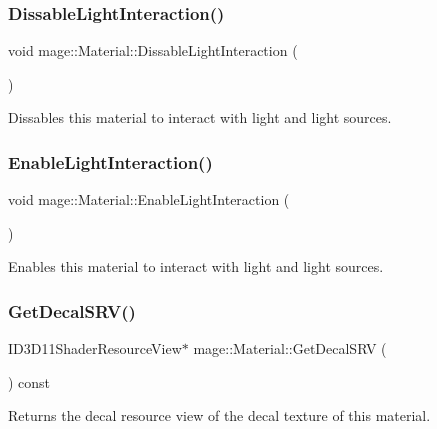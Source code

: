 \subsubsection{\texorpdfstring{Dissable\+Light\+Interaction()}{DissableLightInteraction()}}
{\footnotesize\ttfamily void mage\+::\+Material\+::\+Dissable\+Light\+Interaction (\begin{DoxyParamCaption}{ }\end{DoxyParamCaption})\hspace{0.3cm}{\ttfamily [noexcept]}}

Dissables this material to interact with light and light sources. \hypertarget{structmage_1_1_material_abbcdcc3a9cb44c854212508c8419aa7f}{}\label{structmage_1_1_material_abbcdcc3a9cb44c854212508c8419aa7f} 
\subsubsection{\texorpdfstring{Enable\+Light\+Interaction()}{EnableLightInteraction()}}
{\footnotesize\ttfamily void mage\+::\+Material\+::\+Enable\+Light\+Interaction (\begin{DoxyParamCaption}{ }\end{DoxyParamCaption})\hspace{0.3cm}{\ttfamily [noexcept]}}

Enables this material to interact with light and light sources. \hypertarget{structmage_1_1_material_a8d189673acfe8d0c104873fe0cceb601}{}\label{structmage_1_1_material_a8d189673acfe8d0c104873fe0cceb601} 
\subsubsection{\texorpdfstring{Get\+Decal\+S\+R\+V()}{GetDecalSRV()}}
{\footnotesize\ttfamily I\+D3\+D11\+Shader\+Resource\+View$\ast$ mage\+::\+Material\+::\+Get\+Decal\+S\+RV (\begin{DoxyParamCaption}{ }\end{DoxyParamCaption}) const\hspace{0.3cm}{\ttfamily [noexcept]}}

Returns the decal resource view of the decal texture of this material.

